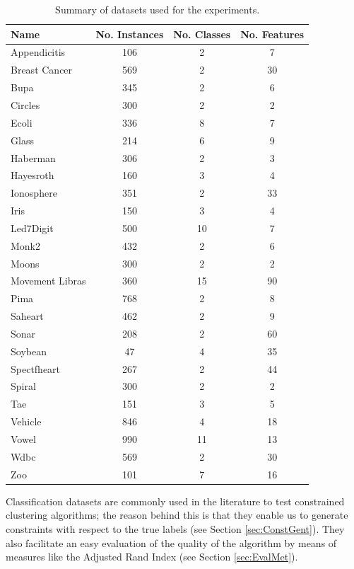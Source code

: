 \documentclass[review]{elsarticle}
\begin{document}
\begin{table}[!h]
	\centering
	\small
	\begin{tabular}{l c c c}
		\hline
		Name & No. Instances & No. Classes & No. Features \\
		\hline
		Appendicitis & 106 & 2 & 7 \\
		Breast Cancer & 569 & 2 & 30 \\
		Bupa & 345 & 2 & 6 \\
		Circles & 300 & 2 & 2 \\
		Ecoli & 336 & 8 & 7 \\
		Glass & 214 & 6 & 9 \\
		Haberman & 306 & 2 & 3 \\
		Hayesroth & 160 & 3 & 4 \\
		Ionosphere & 351 & 2 & 33 \\
		Iris & 150 & 3 & 4 \\
		Led7Digit & 500 & 10 & 7 \\
		Monk2 & 432 & 2 & 6 \\
		Moons & 300 & 2 & 2 \\
		Movement Libras & 360 & 15 & 90 \\
		Pima & 768 & 2 & 8 \\
		Saheart & 462 & 2 & 9 \\
		Sonar & 208 & 2 & 60 \\
		Soybean & 47 & 4 & 35 \\
		Spectfheart & 267 & 2 & 44 \\
		Spiral & 300 & 2 & 2 \\
		Tae & 151 & 3 & 5 \\
		Vehicle & 846 & 4 & 18 \\
		Vowel & 990 & 11 & 13 \\
		Wdbc & 569 & 2 & 30 \\
		Zoo & 101 & 7 & 16 \\
		\hline

	\end{tabular}%
	\caption{Summary of datasets used for the experiments.}
	\label{tab:datasets}
\end{table}

Classification datasets are commonly used in the literature to test constrained clustering algorithms; the reason behind this is that they enable us to generate constraints with respect to the true labels (see Section \ref{sec:ConstGent}). They also facilitate an easy evaluation of the quality of the algorithm by means of measures like the Adjusted Rand Index (see Section \ref{sec:EvalMet}).
\end{document}
